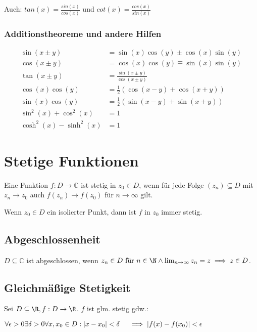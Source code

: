 Auch: $tan(x) = \frac{sin(x)}{cos(x)}$ und $cot(x) = \frac{cos(x)}{sin(x)}$

\subsubsection*{Additionstheoreme und andere Hilfen}

\vspace*{-3mm}
\begin{align*}
	\sin(x\pm y)            &= \sin(x) \cos(y) \pm \cos(x) \sin(y) \\
	\cos(x\pm y)            &= \cos(x) \cos(y) \mp \sin(x) \sin(y) \\
	\tan(x\pm y)            &= \textstyle\frac{\sin(x\pm y)}{\cos(x\pm y)} \\
	\cos(x) \cos(y)         &= \textstyle\frac{1}{2} ( \cos(x-y) + \cos(x+y) ) \\
	\sin(x) \cos(y)         &= \textstyle\frac{1}{2} ( \sin(x-y) + \sin(x+y) ) \\
	\sin^2(x) + \cos^2(x)   &= 1 \\
	\cosh^2(x) - \sinh^2(x) &= 1
\end{align*}


\section*{Stetige Funktionen}

Eine Funktion $f : D \rightarrow \mathbb{C}$ ist stetig in $z_0 \in D$, wenn für jede Folge $(z_n) \subseteq D$ mit $z_n \rightarrow z_0$ auch $f(z_n) \rightarrow f(z_0)$ für $n \rightarrow \infty$ gilt.

Wenn $z_0 \in D$ ein isolierter Punkt, dann ist $f$ in $z_0$ immer stetig.

\subsection*{Abgeschlossenheit}

$D \subseteq \mathbb{C}$ ist abgeschlossen, wenn $z_n \in D \text{ für } n \in \N \land \lim_{n \to \infty} z_n = z \implies z \in D$.

\subsection*{Gleichmäßige Stetigkeit}

Sei $D \subseteq \R, f : D \rightarrow \R$. $f$ ist glm. stetig gdw.:

$\forall \epsilon > 0 \exists \delta > 0 \forall x, x_0 \in D : | x - x_0 | < \delta \\ \hspace*{4mm} \implies | f(x) - f(x_0) | < \epsilon$

